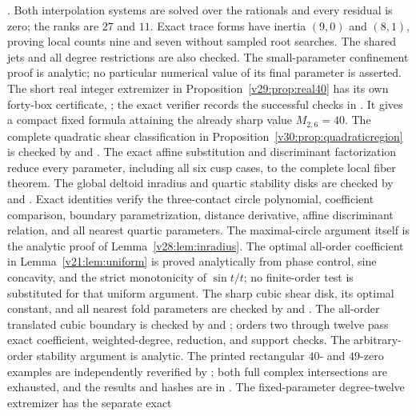 \documentclass[UTF8,11pt]{ctexart}
\theoremstyle{definition}
\numberwithin{equation}{section}
\begin{document}
. Both interpolation systems
are solved over the rationals and every residual is zero; the
ranks are $27$ and $11$. Exact trace forms have inertia $(9,0)$
and $(8,1)$, proving local counts nine and seven without sampled
root searches. The shared jets and all degree restrictions are
also checked. The small-parameter confinement proof is analytic;
no particular numerical value of its final parameter is asserted.
The short real integer extremizer in
Proposition~\ref{v29:prop:real40} has its own forty-box certificate,
; the exact verifier
 records the successful checks in
. It gives a compact fixed
formula attaining the already sharp value $M_{2,6}=40$.
The complete quadratic shear classification in
Proposition~\ref{v30:prop:quadraticregion} is checked by
 and
. The exact affine
substitution and discriminant factorization reduce every parameter,
including all six cusp cases, to the complete local fiber theorem.
The global deltoid inradius and quartic stability disks are checked by
 and
. Exact identities verify the
three-contact circle polynomial, coefficient comparison, boundary
parametrization, distance derivative, affine discriminant relation, and
all nearest quartic parameters. The maximal-circle argument itself is
the analytic proof of Lemma~\ref{v28:lem:inradius}.
The optimal all-order coefficient in Lemma~\ref{v21:lem:uniform}
is proved analytically from phase control, sine concavity, and the
strict monotonicity of $\sin t/t$; no finite-order test is substituted
for that uniform argument.
The sharp cubic shear disk, its optimal constant, and all nearest
fold parameters are checked by 
and .
The all-order translated cubic boundary is checked by
 and
; orders two through
twelve pass exact coefficient, weighted-degree, reduction, and support
checks. The arbitrary-order stability argument is analytic.
The printed rectangular $40$- and $49$-zero examples are independently
reverified by ; both full
complex intersections are exhausted, and the results and hashes are in
.
The fixed-parameter degree-twelve extremizer has the separate exact
\end{document}
